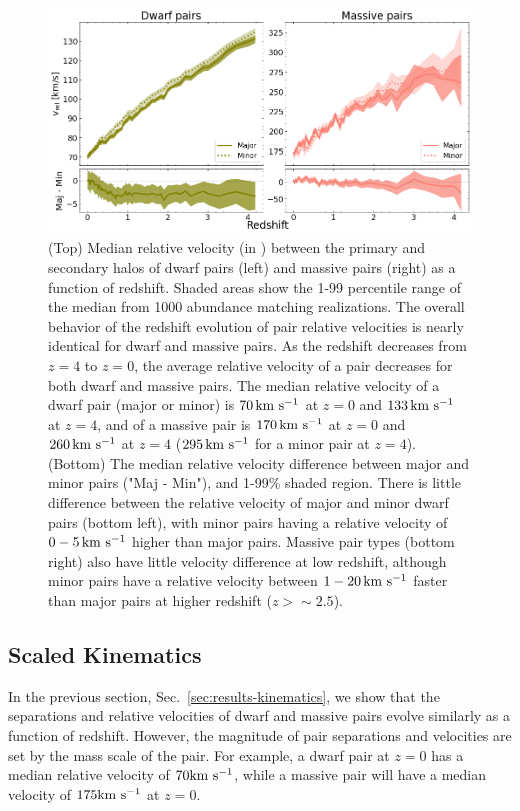 \documentclass[twocolumn]{aastex631}
\begin{document}
        \begin{figure}[htp]
          \centering
          \includegraphics[width=\textwidth]{vel_1000.png}
          \caption{
            (Top) Median relative velocity (in \kms) between the primary and secondary halos of dwarf pairs (left) and massive pairs (right) as a function of redshift. 
            Shaded areas show the 1-99 percentile range of the median from 1000 abundance matching realizations. 
            The overall behavior of the redshift evolution of pair relative velocities is nearly identical for dwarf and massive pairs.
            As the redshift decreases from $z=4$ to $z=0$, the average relative velocity of a pair decreases for both dwarf and massive pairs.
            The median relative velocity of a dwarf pair (major or minor) is $70\,\mathrm{km}~\mathrm{s}^{-1}$ at $z=0$ and $133\,\mathrm{km}~\mathrm{s}^{-1}$ at $z=4$, and of a massive pair is $170\,\mathrm{km}~\mathrm{s}^{-1}$ at $z=0$ and $260\,\mathrm{km}~\mathrm{s}^{-1}$ at $z=4$ ($295\,\mathrm{km}~\mathrm{s}^{-1}$ for a minor pair at $z=4$). 
            (Bottom) The median relative velocity difference between major and minor pairs ("Maj - Min"), and 1-99\% shaded region.
            There is little difference between the relative velocity of major and minor dwarf pairs (bottom left), with minor pairs having a relative velocity of $0-5\,\mathrm{km}~\mathrm{s}^{-1}$ higher than major pairs. 
            Massive pair types (bottom right) also have little velocity difference at low redshift, although minor pairs have a relative velocity between $1-20\,\mathrm{km}~\mathrm{s}^{-1}$ faster than major pairs at higher redshift ($z>\sim 2.5$).
            }
          \label{fig:vel}
        \end{figure}

    \subsection{Scaled Kinematics}\label{sec:results-scaled}
    In the previous section, Sec.~\ref{sec:results-kinematics}, we show that the separations and relative velocities of dwarf and massive pairs evolve similarly as a function of redshift. 
    However, the magnitude of pair separations and velocities are set by the mass scale of the pair. 
    For example, a dwarf pair at $z=0$ has a median relative velocity of $70\mathrm{km}~\mathrm{s}^{-1}$, while a massive pair will have a median velocity of $175\mathrm{km}~\mathrm{s}^{-1}$ at $z=0$.
    
\end{document}
